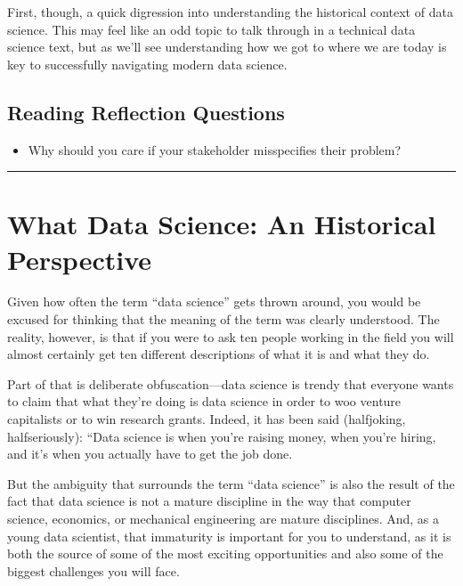 \documentclass[letterpaper,10pt,english]{jupyterBook}
\begin{document}
\sphinxAtStartPar
First, though, a quick digression into understanding the historical context of data science. This may feel like an odd topic to talk through in a technical data science text, but as we’ll see understanding how we got to where we are today is key to successfully navigating modern data science.


\section{Reading Reflection Questions}
\label{\detokenize{10_introduction/30_solving_the_right_problem:reading-reflection-questions}}\begin{itemize}
\item {} 
\sphinxAtStartPar
Why should you care if your stakeholder misspecifies their problem?

\end{itemize}


\bigskip\hrule\bigskip


\sphinxstepscope


\chapter{What  Data Science: An Historical Perspective}
\label{\detokenize{10_introduction/40_data_science_in_historical_context:what-is-data-science-an-historical-perspective}}\label{\detokenize{10_introduction/40_data_science_in_historical_context::doc}}
\sphinxAtStartPar
Given how often the term “data science” gets thrown around, you would be excused for thinking that the meaning of the term was clearly understood. The reality, however, is that if you were to ask ten people working in the field you will almost certainly get ten different descriptions of what it is and what they do.

\sphinxAtStartPar
Part of that is deliberate obfuscation—data science is  trendy that everyone wants to claim that what they’re doing is data science in order to woo venture capitalists or to win research grants. Indeed, it has been said (half\sphinxhyphen{}joking, half\sphinxhyphen{}seriously): “Data science is  when you’re raising money,  when you’re hiring, and it’s  when you actually have to get the job done.

\sphinxAtStartPar
But the ambiguity that surrounds the term “data science” is also the result of the fact that data science is not a mature discipline in the way that computer science, economics, or mechanical engineering are mature disciplines. And, as a young data scientist, that immaturity is important for you to understand, as it is both the source of some of the most exciting opportunities and also some of the biggest challenges you will face.
\end{document}
